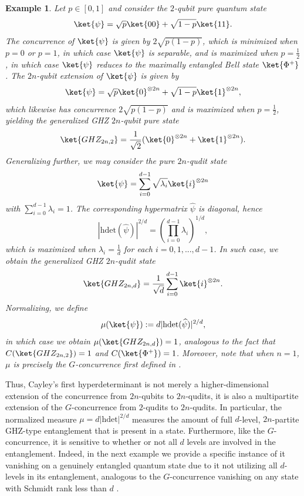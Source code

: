 \documentclass{article}
\newtheorem{eg}{Example}
\begin{document}
\begin{eg}
    Let $p\in [0,1]$ and consider the $2$-qubit pure quantum state
    \[\ket{\psi} = \sqrt{p}\ket{00}+\sqrt{1-p}\ket{11}.\]
    The concurrence of $\ket{\psi}$ is given by $2\sqrt{p(1-p)}$, which is minimized when $p=0$ or $p=1$, in which case $\ket{\psi}$ is separable, and is maximized when $p=\frac{1}{2}$, in which case $\ket{\psi}$ reduces to the maximally entangled Bell state $\ket{\Phi^+}$. The $2n$-qubit extension of $\ket{\psi}$ is given by 
    \[\ket{\psi} = \sqrt{p}\ket{0}^{\otimes 2n}+\sqrt{1-p}\ket{1}^{\otimes 2n},\]
    which likewise has concurrence $2\sqrt{p(1-p)}$ and is maximized when $p=\frac{1}{2}$, yielding the generalized GHZ $2n$-qubit pure state
    \[\ket{GHZ_{2n,2}} = \frac{1}{\sqrt{2}}(\ket{0}^{\otimes 2n}+\ket{1}^{\otimes 2n}).\]
    Generalizing further, we may consider the pure $2n$-qudit state
    \[\ket{\psi} = \sum\limits_{i=0}^{d-1}\sqrt{\lambda_i}\ket{i}^{\otimes 2n}\]
    with $\sum\limits_{i=0}^{d-1}\lambda_i=1$. The corresponding hypermatrix $\widehat{\psi}$ is diagonal, hence 
    \[|\mathrm{hdet}(\widehat{\psi})|^{2/d} = \left(\prod\limits_{i=0}^{d-1}\lambda_i\right)^{1/d},\]
    which is maximized when $\lambda_i = \frac{1}{d}$ for each $i=0,1,...,d-1$. In such case, we obtain the generalized GHZ $2n$-qudit state 
    \[\ket{GHZ_{2n,d}} = \frac{1}{\sqrt{d}}\sum\limits_{i=0}^{d-1}\ket{i}^{\otimes 2n}.\]
    Normalizing, we define
    \[\mu(\ket{\psi}) := d|\mathrm{hdet}(\widehat{\psi})|^{2/d},\]
    in which case we obtain $\mu(\ket{GHZ_{2n,d}})=1$, analogous to the fact that $C(\ket{GHZ_{2n,2}})=1$ and $C(\ket{\Phi^+})=1$. Moreover, note that when $n=1$, $\mu$ is precisely the $G$-concurrence first defined in \cite{gour2005mixed}.  
\end{eg}
Thus, Cayley's first hyperdeterminant is not merely a higher-dimensional extension of the concurrence from $2n$-qubits to $2n$-qudits, it is also a multipartite extension of the $G$-concurrence from $2$-qudits to $2n$-qudits. In particular, the normalized measure $\mu = d|\mathrm{hdet}|^{2/d}$ measures the amount of full $d$-level, $2n$-partite GHZ-type entanglement that is present in a state. Furthermore, like the $G$-concurrence, it is sensitive to whether or not all $d$ levels are involved in the entanglement. Indeed, in the next example we provide a specific instance of it vanishing on a genuinely entangled quantum state due to it not utilizing all $d$-levels in its entanglement, analogous to the $G$-concurrence vanishing on any state with Schmidt rank less than $d$ \cite{sentis2016quantifying}. 
\end{document}
